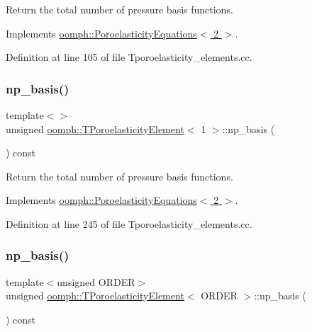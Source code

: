 Return the total number of pressure basis functions. 



Implements \hyperlink{classoomph_1_1PoroelasticityEquations_a44a16186f2923f811623e0cf088ff815}{oomph\+::\+Poroelasticity\+Equations$<$ 2 $>$}.



Definition at line 105 of file Tporoelasticity\+\_\+elements.\+cc.

\mbox{\label{classoomph_1_1TPoroelasticityElement_a380340d846ca1c8982adef1085209d1b}} 
\subsubsection{\texorpdfstring{np\+\_\+basis()}{np\_basis()}\hspace{0.1cm}{\footnotesize\ttfamily [2/3]}}
{\footnotesize\ttfamily template$<$$>$ \\
unsigned \hyperlink{classoomph_1_1TPoroelasticityElement}{oomph\+::\+T\+Poroelasticity\+Element}$<$ 1 $>$\+::np\+\_\+basis (\begin{DoxyParamCaption}{ }\end{DoxyParamCaption}) const\hspace{0.3cm}{\ttfamily [virtual]}}



Return the total number of pressure basis functions. 



Implements \hyperlink{classoomph_1_1PoroelasticityEquations_a44a16186f2923f811623e0cf088ff815}{oomph\+::\+Poroelasticity\+Equations$<$ 2 $>$}.



Definition at line 245 of file Tporoelasticity\+\_\+elements.\+cc.

\mbox{\label{classoomph_1_1TPoroelasticityElement_a5857ac5848d232bfc8b9ae84dde851fe}} 
\subsubsection{\texorpdfstring{np\+\_\+basis()}{np\_basis()}\hspace{0.1cm}{\footnotesize\ttfamily [3/3]}}
{\footnotesize\ttfamily template$<$unsigned O\+R\+D\+ER$>$ \\
unsigned \hyperlink{classoomph_1_1TPoroelasticityElement}{oomph\+::\+T\+Poroelasticity\+Element}$<$ O\+R\+D\+ER $>$\+::np\+\_\+basis (\begin{DoxyParamCaption}{ }\end{DoxyParamCaption}) const\hspace{0.3cm}{\ttfamily [virtual]}}



